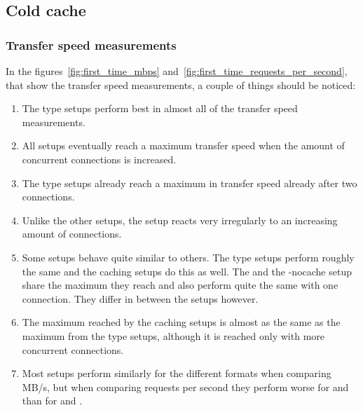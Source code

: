 \documentclass[twoside,openright]{uva-bachelor-thesis}
\begin{document}
\subsection{Cold cache}

\subsubsection{Transfer speed measurements}
In the figures~\ref{fig:first_time_mbps}
and~\ref{fig:first_time_requests_per_second}, that show the transfer speed
measurements, a couple of things should be noticed:
\begin{enumerate}
    \item
        The \cdn type setups perform best in almost all of the transfer
        speed measurements.

    \item
        All setups eventually reach a maximum transfer speed when the amount of
        concurrent connections is increased.

    \item
        The \cdn type setups already reach a maximum in transfer speed already
        after two connections.

    \item
        Unlike the other setups, the \ipp setup reacts very irregularly to
        an increasing amount of connections.

    \item
        Some setups behave quite similar to others. The \cdn type setups perform
        roughly the same and the caching \lt setups do this as well. The \ipp
        and the \lt-nocache setup share the maximum they reach and also perform
        quite the same with one connection. They differ in between the setups
        however.

    \item
        The maximum reached by the caching \lt setups is almost as the same as
        the maximum from the \cdn type setups, although it is reached only with
        more concurrent connections.

    \item
        Most setups perform similarly for the different formats when comparing
        MB/s, but when comparing requests per second they perform worse for \hds
        and \hls than for \dash and \iss.

\end{enumerate}



\FloatBarrier
\end{document}
